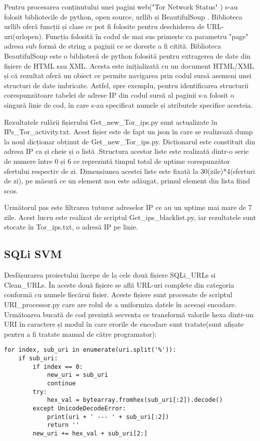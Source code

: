 Pentru procesarea  conținutului unei pagini web("Tor Network Status" \cite{tot_status}) s-au folosit bibliotecile de python, open source, urllib și BeautifulSoup \cite{btf_soup}.  Biblioteca urllib oferă funcții și clase ce pot fi folosite pentru deschiderea de URL-uri(urlopen). Funcția folosită în codul de mai sus primește ca parametru "page" adresa sub formă de string a paginii ce se dorește a fi citită. Biblioteca BeautifulSoup este o bibliotecă de python folosită pentru extragerea de date din fișiere de HTML sau XML. Acesta este inițializată cu un document HTML/XML și că rezultat oferă un obiect ce permite navigarea prin codul sursă asemeni unei structuri de date imbricate. Astfel, spre exemplu, pentru identificarea structurii corespunzătoare tabelei de adrese IP din codul sursă al paginii s-a folosit o singură linie de cod, în care s-au specificat numele și atributele specifice acesteia. 

Rezultatele rulării fișierului  Get\_new\_Tor\_ips.py sunt  actualizate în  IPs\_Tor\_activity.txt.  Acest fișier este de fapt un json în care se realizează dump la noul dicționar obținut de   Get\_new\_Tor\_ips.py.  Dicționarul este constituit din adresa IP ca și cheie și o listă .Structura acestor liste este realizată dintr-o serie de numere între 0 și 6 ce reprezintă timpul total de uptime corespunzător sfertului respectiv de zi. Dimensiunea acestei liste este fixată la 30(zile)*4(sferturi de zi), pe măsură ce un element nou este adăugat, primul element din lista fiind scos. 

Următorul pas este filtrarea tuturor adreselor IP ce au un uptime mai mare de 7 zile. Acest lucru este realizat de scriptul  Get\_ips\_blacklist.py, iar rezultatele sunt stocate în Tor\_ips.txt, o adresă IP pe linie. 

\subsection{SQLi SVM}
Desfășurarea proiectului începe de la cele două fișiere SQLi\_URLs si Clean\_URLs.  În aceste două fișiere se află URL-uri complete din categoria conformă cu numele fiecărui fișier. Aceste fișiere sunt procesate de scriptul  URI\_processor.py  care are rolul de a uniformiza datele în aceeași encodare. Următoarea bucată de cod prezintă secvența ce transformă valorile hexa dintr-un URI în caractere și modul în care erorile de encodare sunt tratate(sunt afișate pentru a fi tratate manual de către programator): 

\lstset{language=python,frame=single, showstringspaces=false}
\begin{lstlisting}
for index, sub_uri in enumerate(uri.split('%')):
    if sub_uri:
        if index == 0:
            new_uri = sub_uri
            continue
        try:
            hex_val = bytearray.fromhex(sub_uri[:2]).decode()
        except UnicodeDecodeError:
            print(uri + ' --- ' + sub_uri[:2])
            return ''
        new_uri += hex_val + sub_uri[2:]
\end{lstlisting}

